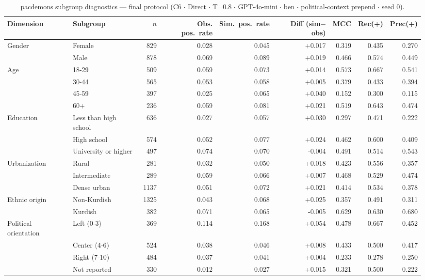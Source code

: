 \begin{table}[htb]
\centering
\small
\caption{pacdemons subgroup diagnostics --- final protocol (C6 $\cdot$ Direct $\cdot$ T{=}0.8 $\cdot$ GPT-4o-mini $\cdot$ ben $\cdot$ political-context prepend $\cdot$ seed 0).}
\label{tab:appG_pacdemons_subgroups}
\begin{adjustbox}{max width=\textwidth}
\begin{tabular}{llrrrrrrr}
\toprule
Dimension & Subgroup & $n$ & Obs. pos.\ rate & Sim.\ pos.\ rate & Diff (sim$-$obs) & MCC & Rec(+) & Prec(+) \\
\midrule
Gender & Female & 829 & 0.028 & 0.045 & +0.017 & 0.319 & 0.435 & 0.270 \\
 & Male & 878 & 0.069 & 0.089 & +0.019 & 0.466 & 0.574 & 0.449 \\
Age & 18-29 & 509 & 0.059 & 0.073 & +0.014 & 0.573 & 0.667 & 0.541 \\
 & 30-44 & 565 & 0.053 & 0.058 & +0.005 & 0.379 & 0.433 & 0.394 \\
 & 45-59 & 397 & 0.025 & 0.065 & +0.040 & 0.152 & 0.300 & 0.115 \\
 & 60+ & 236 & 0.059 & 0.081 & +0.021 & 0.519 & 0.643 & 0.474 \\
Education & Less than high school & 636 & 0.027 & 0.057 & +0.030 & 0.297 & 0.471 & 0.222 \\
 & High school & 574 & 0.052 & 0.077 & +0.024 & 0.462 & 0.600 & 0.409 \\
 & University or higher & 497 & 0.074 & 0.070 & -0.004 & 0.491 & 0.514 & 0.543 \\
Urbanization & Rural & 281 & 0.032 & 0.050 & +0.018 & 0.423 & 0.556 & 0.357 \\
 & Intermediate & 289 & 0.059 & 0.066 & +0.007 & 0.468 & 0.529 & 0.474 \\
 & Dense urban & 1137 & 0.051 & 0.072 & +0.021 & 0.414 & 0.534 & 0.378 \\
Ethnic origin & Non-Kurdish & 1325 & 0.043 & 0.068 & +0.025 & 0.357 & 0.491 & 0.311 \\
 & Kurdish & 382 & 0.071 & 0.065 & -0.005 & 0.629 & 0.630 & 0.680 \\
Political orientation & Left (0-3) & 369 & 0.114 & 0.168 & +0.054 & 0.478 & 0.667 & 0.452 \\
 & Center (4-6) & 524 & 0.038 & 0.046 & +0.008 & 0.433 & 0.500 & 0.417 \\
 & Right (7-10) & 484 & 0.037 & 0.041 & +0.004 & 0.233 & 0.278 & 0.250 \\
 & Not reported & 330 & 0.012 & 0.027 & +0.015 & 0.321 & 0.500 & 0.222 \\
\bottomrule
\end{tabular}
\end{adjustbox}
\end{table}
